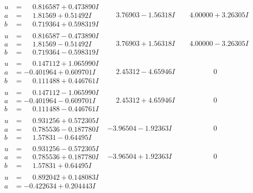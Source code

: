 \documentclass[1p]{elsarticle_modified}
\theoremstyle{definition}
\begin{document}
$$\begin{array}{c|c|c}
\begin{aligned}
u &= \phantom{-}0.816587 + 0.473890 I \\
a &= \phantom{-}1.81569 + 0.51492 I \\
b &= \phantom{-}0.719364 + 0.598319 I\end{aligned}
 & \phantom{-}3.76903 - 1.56318 I & \phantom{-}4.00000 + 3.26305 I \\ \hline\begin{aligned}
u &= \phantom{-}0.816587 - 0.473890 I \\
a &= \phantom{-}1.81569 - 0.51492 I \\
b &= \phantom{-}0.719364 - 0.598319 I\end{aligned}
 & \phantom{-}3.76903 + 1.56318 I & \phantom{-}4.00000 - 3.26305 I \\ \hline\begin{aligned}
u &= \phantom{-}0.147112 + 1.065990 I \\
a &= -0.401964 + 0.609701 I \\
b &= \phantom{-}0.111488 + 0.446761 I\end{aligned}
 & \phantom{-}2.45312 - 4.65946 I & \phantom{-0.000000 } 0 \\ \hline\begin{aligned}
u &= \phantom{-}0.147112 - 1.065990 I \\
a &= -0.401964 - 0.609701 I \\
b &= \phantom{-}0.111488 - 0.446761 I\end{aligned}
 & \phantom{-}2.45312 + 4.65946 I & \phantom{-0.000000 } 0 \\ \hline\begin{aligned}
u &= \phantom{-}0.931256 + 0.572305 I \\
a &= \phantom{-}0.785536 - 0.187780 I \\
b &= \phantom{-}1.57831 - 0.64495 I\end{aligned}
 & -3.96504 - 1.92363 I & \phantom{-0.000000 } 0 \\ \hline\begin{aligned}
u &= \phantom{-}0.931256 - 0.572305 I \\
a &= \phantom{-}0.785536 + 0.187780 I \\
b &= \phantom{-}1.57831 + 0.64495 I\end{aligned}
 & -3.96504 + 1.92363 I & \phantom{-0.000000 } 0 \\ \hline\begin{aligned}
u &= \phantom{-}0.892042 + 0.148083 I \\
a &= -0.422634 + 0.204443 I \\

\end{aligned}
\end{array}$$
\end{document}
